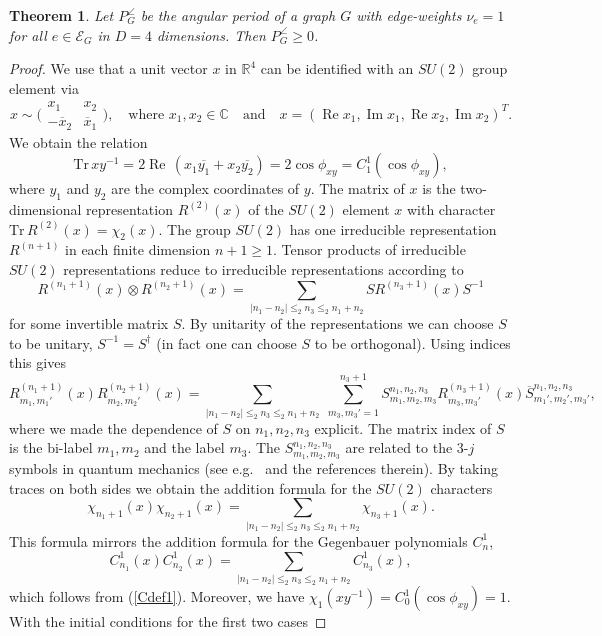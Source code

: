 \documentclass[oneside]{amsart}
\newcommand{\CC}{{\mathbb C}}
\newcommand{\RR}{{\mathbb R}}
\newcommand{\xx}{{\overline{x}}}
\newcommand{\sE}{\mathcal{E}}
\renewcommand{\Im}{\mathop\mathrm{Im}}
\renewcommand{\Re}{\mathop\mathrm{Re}}
\theoremstyle{plain}
\newtheorem{thm}{Theorem}
\begin{document}
\begin{thm}\label{D4posthm}
Let $P_G^\angle$ be the angular period of a graph $G$ with edge-weights $\nu_e=1$ for all $e\in\sE_G$ in $D=4$ dimensions. Then $P_G^\angle\geq0$.
\end{thm}
\begin{proof}
We use that a unit vector $x$ in $\RR^4$ can be identified with an $SU(2)$ group element via
$$
x\sim\Big(\begin{array}{cc}x_1&x_2\\
-\xx_2&\xx_1\end{array}\Big),\quad\text{where }x_1,x_2\in\CC\quad\text{and}\quad x=(\Re x_1,\Im x_1,\Re x_2,\Im x_2)^T.
$$
We obtain the relation
$$
\mathrm{Tr}\,xy^{-1}=2\Re\,(x_1\overline{y_1}+x_2\overline{y_2})=2\cos\phi_{xy}=C^1_1(\cos\phi_{xy}),
$$
where $y_1$ and $y_2$ are the complex coordinates of $y$. The matrix of $x$ is the two-dimensional representation $R^{(2)}(x)$ of the $SU(2)$ element $x$ with character
$\mathrm{Tr}\,R^{(2)}(x)=\chi_2(x)$. The group $SU(2)$ has one irreducible representation $R^{(n+1)}$ in each finite dimension $n+1\geq1$. Tensor products of irreducible $SU(2)$ representations
reduce to irreducible representations according to
$$
R^{(n_1+1)}(x)\otimes R^{(n_2+1)}(x)=\sum_{|n_1-n_2|\leq_2n_3\leq_2n_1+n_2}SR^{(n_3+1)}(x)S^{-1}
$$
for some invertible matrix $S$. By unitarity of the representations we can choose $S$ to be unitary, $S^{-1}=S^\dagger$ (in fact one can choose $S$ to be orthogonal). Using indices this gives
\begin{equation}\label{RRR}
R^{(n_1+1)}_{m_1,m_1'}(x)R^{(n_2+1)}_{m_2,m_2'}(x)=\sum_{|n_1-n_2|\leq_2n_3\leq_2n_1+n_2}\;\sum_{m_3,m_3'=1}^{n_3+1}S^{n_1,n_2,n_3}_{m_1,m_2,m_3}R^{(n_3+1)}_{m_3,m_3'}(x)
\overline S^{n_1,n_2,n_3}_{m_1',m_2',m_3'},
\end{equation}
where we made the dependence of $S$ on $n_1,n_2,n_3$ explicit. The matrix index of $S$ is the bi-label $m_1,m_2$ and the label $m_3$.
The $S^{n_1,n_2,n_3}_{m_1,m_2,m_3}$ are related to the 3-$j$ symbols in quantum mechanics (see e.g.\ \cite{Smultij} and the references therein).
By taking traces on both sides we obtain the addition formula for the $SU(2)$ characters
$$
\chi_{n_1+1}(x)\chi_{n_2+1}(x)=\sum_{|n_1-n_2|\leq_2n_3\leq_2n_1+n_2}\chi_{n_3+1}(x).
$$
This formula mirrors the addition formula for the Gegenbauer polynomials $C^1_n$,
$$
C^1_{n_1}(x)C^1_{n_2}(x)=\sum_{|n_1-n_2|\leq_2n_3\leq_2n_1+n_2}C^1_{n_3}(x),
$$
which follows from (\ref{Cdef1}). Moreover, we have $\chi_1(xy^{-1})=C^1_0(\cos\phi_{xy})=1$. With the initial conditions for the first two cases

\end{proof}
\end{document}

